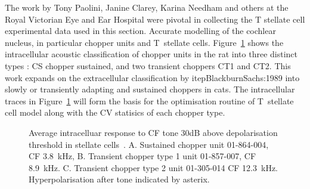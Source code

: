

The work by Tony Paolini, Janine Clarey, Karina Needham and others at the Royal Victorian Eye and Ear Hospital were pivotal in collecting the T stellate cell experimental data used in this section.
Accurate modelling of the cochlear nucleus, in particular chopper units and T~stellate cells.
Figure~\ref{fig:PaoliniAIV} shows the intracellular acoustic classification of chopper units in the rat into three distinct types \citep{PaoliniClareyEtAl:2005}: CS chopper sustained, and two transient choppers CT1 and CT2.
This work expands on the extracellular classification by itep{BlackburnSachs:1989} into slowly or transiently adapting and sustained choppers in cats.
The intracellular traces in Figure~\ref{fig:PaoliniAIV} will form the basis for the optimisation routine of T~stellate cell model along with the CV statisics of each chopper type.


\begin{figure}[htb]
  \centering
{}\hfill%
\hfill%
\caption[Average intracelluar response data in stellate cells in rats.]{Average   intracelluar response to CF tone 30dB above depolarisation threshold in  stellate  cells~\citep[Reproduced~from~][]{PaoliniClareyEtAl:2005}. 
A. Sustained chopper unit 01-864-004, CF 3.8~kHz, 
B. Transient chopper type 1 unit 01-857-007, CF 8.9~kHz. 
C. Transient chopper type 2 unit 01-305-014 CF 12.3~kHz. 
Hyperpolarisation after tone indicated by asterix.  \label{fig:PaoliniAIV}}
\end{figure}


